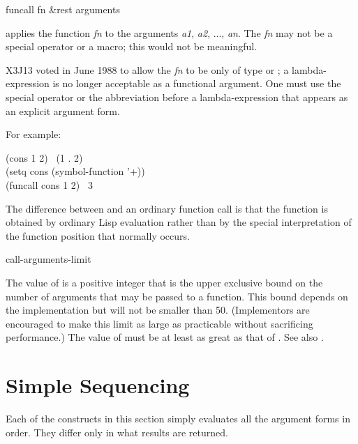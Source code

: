 \begin{defun}[Function]
funcall fn &rest arguments

applies the function \emph{fn} to the arguments
\emph{a1}, \emph{a2}, ..., \emph{an}.
The \emph{fn} may not
be a special operator or a macro; this would not be meaningful.

\begin{newer}
X3J13 voted in June 1988  to allow the \emph{fn}
to be only of type  or ; a lambda-expression
is no longer acceptable as a functional argument.  One must use the
 special operator or the abbreviation  before
a lambda-expression that appears as an  explicit argument form.
\end{newer}

For example:
\begin{lisp}
(cons 1 2) \EV\ (1 . 2) \\
(setq cons (symbol-function '+)) \\
(funcall cons 1 2) \EV\ 3
\end{lisp}
The difference between  and an ordinary function call is that
the function is obtained by ordinary Lisp evaluation rather than
by the special interpretation of the function position that normally
occurs.
\end{defun}

\begin{defun}[Constant]
call-arguments-limit

The value of  is a positive integer that is
the upper exclusive bound on the number of arguments that may
be passed to a function.  This bound depends on the implementation
but will not be smaller than 50.
(Implementors are encouraged to make this limit as large as practicable
without sacrificing performance.)
The value of  must be at
least as great as that of .
See also .
\end{defun}

\section{Simple Sequencing}

Each of the constructs in this section simply evaluates all the
argument forms in order.  They differ only in what results
are returned.

